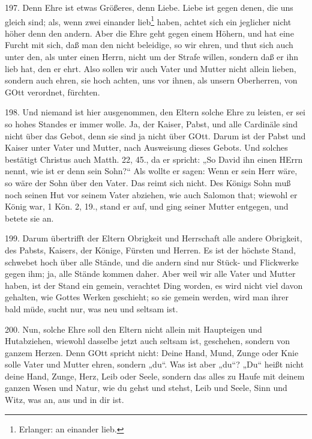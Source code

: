197. Denn Ehre ist etwas Größeres, denn Liebe. Liebe ist gegen denen, die uns gleich sind; als, wenn zwei einander lieb\footnote{Erlanger: an einander lieb.} haben, achtet sich ein jeglicher nicht höher denn den andern. Aber die Ehre geht gegen einem Höhern, und hat eine Furcht mit sich, daß man den nicht beleidige, so wir ehren, und thut sich auch unter den, als unter einen Herrn, nicht um der Strafe willen, sondern daß er ihn lieb hat, den er ehrt. Also sollen wir auch Vater und Mutter nicht allein lieben, sondern auch ehren, sie hoch achten, uns vor ihnen, als unsern Oberherren, von GOtt verordnet, fürchten.

198. Und niemand ist hier ausgenommen, den Eltern solche Ehre zu leisten, er sei so hohes Standes er immer wolle. Ja, der Kaiser, Pabst, und alle Cardinäle sind nicht über das Gebot, denn sie sind ja nicht über GOtt. Darum ist der Pabst und Kaiser unter Vater und Mutter, nach Ausweisung dieses Gebots. Und solches bestätigt Christus auch Matth. 22, 45., da er spricht: „So David ihn einen HErrn nennt, wie ist er denn sein Sohn?“ Als wollte er sagen: Wenn er sein Herr wäre, so wäre der Sohn über den Vater. Das reimt sich nicht. Des Königs Sohn muß noch seinen Hut vor seinem Vater abziehen, wie auch Salomon that; wiewohl er König war, 1 Kön. 2, 19., stand er auf, und ging seiner Mutter entgegen, und betete sie an.

199. Darum übertrifft der Eltern Obrigkeit und Herrschaft alle andere Obrigkeit, des Pabsts, Kaisers, der Könige, Fürsten und Herren. Es ist der höchste Stand, schwebet hoch über alle Stände, und die andern sind nur Stück- und Flickwerke gegen ihm; ja, alle Stände kommen daher. Aber weil wir alle Vater und Mutter haben, ist der Stand ein gemein, verachtet Ding worden, es wird nicht viel davon gehalten, wie
Gottes Werken geschieht; so sie gemein werden, wird man ihrer bald müde, sucht nur, was neu und seltsam ist.

200. Nun, solche Ehre soll den Eltern nicht allein mit Haupteigen und Hutabziehen, wiewohl dasselbe jetzt auch seltsam ist, geschehen, sondern von ganzem Herzen. Denn GOtt spricht nicht: Deine Hand, Mund, Zunge oder Knie solle Vater und Mutter ehren, sondern „du“. Was ist aber „du“? „Du“ heißt nicht deine Hand, Zunge, Herz, Leib oder Seele, sondern das alles zu Haufe mit deinem ganzen Wesen und Natur, wie du gehst und stehst, Leib und Seele, Sinn und Witz, was an, aus und in dir ist.

